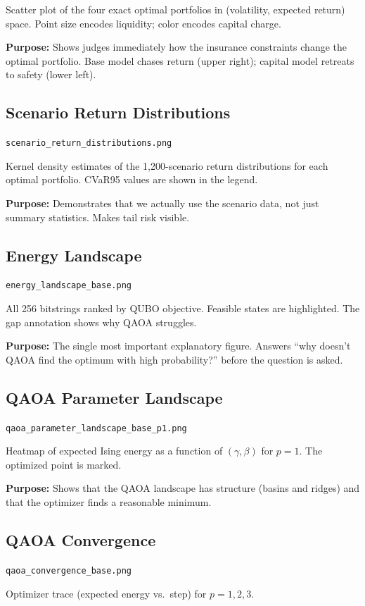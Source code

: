 \documentclass[12pt, a4paper]{article}
\begin{document}
Scatter plot of the four exact optimal portfolios in (volatility, expected return)
space. Point size encodes liquidity; color encodes capital charge.

\textbf{Purpose:} Shows judges immediately how the insurance constraints change
the optimal portfolio. Base model chases return (upper right); capital model
retreats to safety (lower left).

\subsection{Scenario Return Distributions}
\texttt{scenario\_return\_distributions.png}

Kernel density estimates of the 1{,}200-scenario return distributions for each
optimal portfolio. CVaR95 values are shown in the legend.

\textbf{Purpose:} Demonstrates that we actually use the scenario data, not just
summary statistics. Makes tail risk visible.

\subsection{Energy Landscape}
\texttt{energy\_landscape\_base.png}

All 256 bitstrings ranked by QUBO objective. Feasible states are highlighted.
The gap annotation shows why QAOA struggles.

\textbf{Purpose:} The single most important explanatory figure. Answers ``why
doesn't QAOA find the optimum with high probability?'' before the question is
asked.

\subsection{QAOA Parameter Landscape}
\texttt{qaoa\_parameter\_landscape\_base\_p1.png}

Heatmap of expected Ising energy as a function of $(\gamma, \beta)$ for $p = 1$.
The optimized point is marked.

\textbf{Purpose:} Shows that the QAOA landscape has structure (basins and ridges)
and that the optimizer finds a reasonable minimum.

\subsection{QAOA Convergence}
\texttt{qaoa\_convergence\_base.png}

Optimizer trace (expected energy vs.\ step) for $p = 1, 2, 3$.
\end{document}
